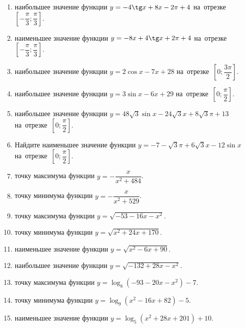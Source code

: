 \documentclass[a4paper,10pt]{article}
\begin{document}
\begin{enumerate}
\item {} наибольшее значение функции $y=-4\tg x +8x-2\pi +4$ на~отрезке~$\left[-\dfrac{\pi}{3};\dfrac{\pi}{3}\right]$.

\item {} наименьшее значение функции $y=-8x +4\tg x+2\pi+4$ на~отрезке~$\left[-\dfrac{\pi}{3};\dfrac{\pi}{3}\right]$.

\item {} наибольшее значение функции $y=2\cos x-7x+28$ на~отрезке~$\left[0;\dfrac{3\pi}{2}\right]$.

\item {} наибольшее значение функции $y=3\sin x-6x+29$ на~отрезке~$\left[0;\dfrac{\pi}{2}\right]$.

\item {} наибольшее значение функции $y=48\sqrt{3}\sin x-24\sqrt{3}x+8\sqrt{3}\pi +13$ на~отрезке~$\left[0;\dfrac{\pi}{2}\right]$.

\item Найдите наименьшее значение функции $y=-7-\sqrt{3}\pi+6\sqrt{3}x-12\sin x$ на~отрезке~$\left[0;\dfrac{\pi}{2}\right]$.

\item {} точку максимума функции $y=-\dfrac{x}{ x^2 +484}$.

\item {} точку минимума функции $y=-\dfrac{x}{ x^2 +529}$.

\item {} точку максимума функции $y=\sqrt{-53-16x-x^2}$.

\item {} точку минимума функции $y=\sqrt{x^2+24x+170}$.

\item {} наименьшее значение функции $y=\sqrt{x^2-6x+90}$.

\item {} наибольшее значение функции $y=\sqrt{-132+28x-x^2}$.

\item {} точку максимума функции $y=\log_8\left(-93-20x-x^2\right)-7$.

\item {} точку минимума функции $y=\log_9\left(x^2-16x+82\right)-5$.

\item {} наименьшее значение функции $y=\log_5\left(x^2+28x+201\right)+10$.


\end{enumerate}
\end{document}
